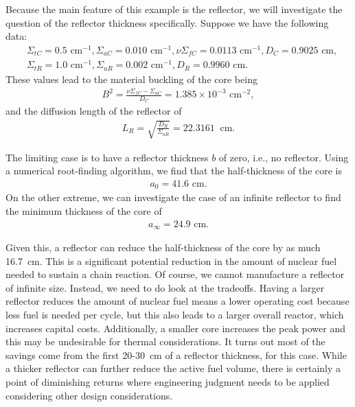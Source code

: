 Because the main feature of this example is the reflector, we will investigate the question of the reflector thickness specifically. Suppose we have the following data:
\begin{align}
  &\Sigma_{tC} = 0.5\text{ cm$^{-1}$}, \Sigma_{aC} = 0.010\text{ cm$^{-1}$}, \nu\Sigma_{fC} = 0.0113\text{ cm$^{-1}$}, D_C = 0.9025\text{ cm}, \nonumber \\
  &\Sigma_{tR} = 1.0\text{ cm$^{-1}$}, \Sigma_{aR} = 0.002\text{ cm$^{-1}$}, D_R = 0.9960\text{ cm}. \nonumber
\end{align}
These values lead to the material buckling of the core being
\begin{align}
  B^2 = \frac{ \nu\Sigma_{fC} - \Sigma_{aC} }{ D_C } = 1.385 \times 10^{-3}\text{ cm$^{-2}$}, \nonumber
\end{align}
and the diffusion length of the reflector of
\begin{align}
  L_R = \sqrt{ \frac{D_R}{\Sigma_{aR}} } = 22.3161~\text{ cm}. \nonumber
\end{align}

The limiting case is to have a reflector thickness $b$ of zero, i.e., no reflector. Using a numerical root-finding algorithm, we find that the half-thickness of the core is
\begin{align}
  a_0 = 41.6\text{ cm}. \nonumber
\end{align}
On the other extreme, we can investigate the case of an infinite reflector to find the minimum thickness of the core of
\begin{align}
  a_\infty = 24.9\text{ cm}. \nonumber
\end{align}

Given this, a reflector can reduce the half-thickness of the core by as much 16.7~cm. This is a significant potential reduction in the amount of nuclear fuel needed to sustain a chain reaction. Of course, we cannot manufacture a reflector of infinite size. Instead, we need to do look at the tradeoffs. Having a larger reflector reduces the amount of nuclear fuel means a lower operating cost because less fuel is needed per cycle, but this also leads to a larger overall reactor, which increases capital costs. Additionally, a smaller core increases the peak power and this may be undesirable for thermal considerations. It turns out most of the savings come from the first 20-30~cm of a reflector thickness, for this case. While a thicker reflector can further reduce the active fuel volume, there is certainly a point of diminishing returns where engineering judgment needs to be applied considering other design considerations.

